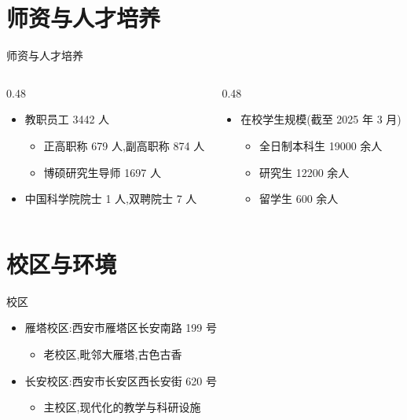 \documentclass{beamer}
\begin{document}
\section{师资与人才培养}
\begin{frame}{师资与人才培养}
  \begin{columns}[T] %
    \begin{column}{0.48\textwidth}
      \begin{itemize}
        \item 教职员工 3442 人
        \begin{itemize}
          \item 正高职称 679 人,副高职称 874 人
          \item 博硕研究生导师 1697 人
        \end{itemize}
        \item 中国科学院院士 1 人,双聘院士 7 人
      \end{itemize}
    \end{column}%
    \hfill%
    \begin{column}{0.48\textwidth}
      \begin{itemize}
        \item 在校学生规模(截至 2025 年 3 月)
        \begin{itemize}
          \item 全日制本科生 19000 余人
          \item 研究生 12200 余人
          \item 留学生 600 余人
        \end{itemize}
      \end{itemize}
    \end{column}%
  \end{columns}
\end{frame}

\section{校区与环境}
\begin{frame}{校区}
  \begin{itemize}
    \item 雁塔校区:西安市雁塔区长安南路 199 号
    \begin{itemize}
      \item 老校区,毗邻大雁塔,古色古香
    \end{itemize}
    \item 长安校区:西安市长安区西长安街 620 号
    \begin{itemize}
      \item 主校区,现代化的教学与科研设施
    \end{itemize}
  \end{itemize}
\end{frame}
\end{document}
